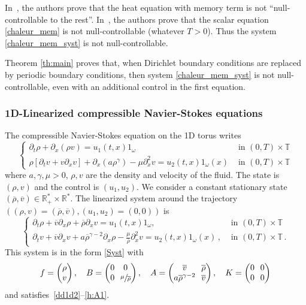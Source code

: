 \documentclass[11pt]{article}
\newcommand{\Subsubsection}{\subsubsection}
\theoremstyle{plain}
\theoremstyle{definition}
\theoremstyle{remark}
\newcommand{\set}{\mathbb}
\newcommand{\R}{} %
\renewcommand{\R}{\set{R}}
\newcommand{\T}{\set{T}}
\begin{document}
In~\cite{ivanov_2009}, the authors prove that the heat equation with memory term is not ``null-controllable to the rest''.
In~\cite{guerrero_2013}, the authors prove that the scalar equation \eqref{chaleur_mem} is not null-controllable (whatever $T>0$).
Thus the system \eqref{chaleur_mem_syst} is not null-controllable.

Theorem \ref{th:main} proves that, when Dirichlet boundary conditions are replaced by periodic boundary conditions, then system \eqref{chaleur_mem_syst} is not null-controllable, even with an additional control in the first equation.

\Subsubsection{1D-Linearized compressible Navier-Stokes equations}

The compressible Navier-Stokes equation on the 1D torus writes
\[
\begin{cases}
\partial_t \rho + \partial_x (\rho v) = u_1(t,x) 1_\omega \quad & \text{ in } (0,T)\times\T \\
\rho[\partial_t v + v \partial_x v ] + \partial_x(a \rho^\gamma)- \mu \partial_x^2v = u_2(t,x)1_\omega(x) & \text{ in } (0,T)\times\T
\end{cases}
\]
where $a,\gamma, \mu>0$, $\rho, v$ are the density and velocity of the fluid. The state is $(\rho,v)$ and the control is $(u_1,u_2)$. We consider a constant stationary state $(\overline{\rho},\overline{v}) \in \R^*_+ \times \R^*$. The linearized system around the trajectory $((\rho,v)=(\overline{\rho},\overline{v}),(u_1,u_2)=(0,0))$ is
\begin{equation} \label{NSCL}
\begin{cases}
\partial_t \rho + \overline{v} \partial_x \rho + \overline{\rho}\partial_x v = u_1(t,x) 1_\omega, \ & \text{ in } (0,T)\times\T
\\
\partial_t v + \overline{v} \partial_x v + a \overline{\rho}^{\gamma-2} \partial_x \rho - \frac{\mu}{\overline{\rho}} \partial_x^2 v = u_2(t,x)1_\omega(x)\,, & \text{ in } (0,T)\times\T\,.
\end{cases}
\end{equation}
This system is in the form \eqref{Syst} with
\[\arraycolsep3.5pt
f=\begin{pmatrix}
\rho \\ v
\end{pmatrix}, \quad
B=\begin{pmatrix}
0 & 0 \\ 0 & \sfrac{\mu}{\overline{\rho}}
\end{pmatrix}, \quad
A=\begin{pmatrix}
\overline{v} & \overline{\rho} \\ a \overline{\rho}^{\gamma-2} & \overline{v}
\end{pmatrix}, \quad
K=\begin{pmatrix}
0 & 0 \\ 0 & 0
\end{pmatrix}
\]
and satisfies~\eqref{dd1d2}--\eqref{h:A1}.
\end{document}
